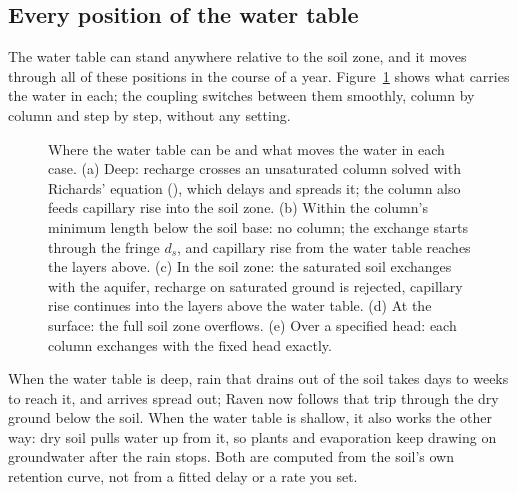\subsection{Every position of the water table}\label{sec:szregimes}
The water table can stand anywhere relative to the soil zone, and it moves through all of these positions in the
course of a year. Figure~\ref{fig:szregimes} shows what carries the water in each; the coupling switches between them
smoothly, column by column and step by step, without any setting.
\begin{figure}[!htbp]\centering
\caption{Where the water table can be and what moves the water in each case. (a) Deep: recharge crosses an unsaturated
column solved with Richards' equation (), which delays and spreads it; the column also
feeds capillary rise into the soil zone. (b) Within the column's minimum length below the soil base: no column; the
exchange starts through the fringe $d_s$, and capillary rise from the water table reaches the layers above. (c) In the
soil zone: the saturated soil exchanges with the aquifer, recharge on saturated ground is rejected, capillary rise
continues into the layers above the water table. (d) At the surface: the full soil zone overflows. (e) Over a specified
head: each column exchanges with the fixed head exactly.}\label{fig:szregimes}
\end{figure}

\begin{plain}
When the water table is deep, rain that drains out of the soil takes days to weeks to reach it, and arrives spread
out; Raven now follows that trip through the dry ground below the soil. When the water table is shallow, it also
works the other way: dry soil pulls water up from it, so plants and evaporation keep drawing on groundwater after the
rain stops. Both are computed from the soil's own retention curve, not from a fitted delay or a rate you set.
\end{plain}

